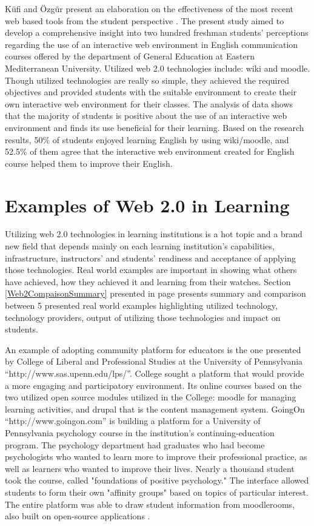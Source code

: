 \documentclass[12pt,a4paper,final,twoside,onecolumn,titlepage]{book}
\begin{document}
Küfi and Özgür present an elaboration on the effectiveness of the most recent web based tools from the student perspective \cite{W11}. The present study aimed to develop a comprehensive insight into two hundred freshman students’ perceptions regarding the use of an interactive web environment in English communication courses offered by the department of General Education at Eastern Mediterranean University. Utilized web 2.0 technologies include: wiki and moodle. Though utilized technologies are really so simple, they achieved the required objectives and provided students with the suitable environment to create their own interactive web environment for their classes. The analysis of data shows that the majority of students is positive about the use of an interactive web environment and finds its use beneficial for their learning. Based on the research results, 50\% of students enjoyed learning English by using wiki/moodle, and 52.5\% of them agree that the interactive web environment created for English course helped them to improve their English.

\section{Examples of Web 2.0 in Learning}
Utilizing web 2.0 technologies in learning institutions is a hot topic and a brand new field that depends mainly on each learning institution’s capabilities, infrastructure, instructors’ and students’ readiness and acceptance of applying those technologies. Real world examples are important in showing what others have achieved, how they achieved it and learning from their watches.  Section \ref{Web2CompaisonSummary} presented in page \pageref{Web2CompaisonSummary} presents summary and comparison between 5 presented real world examples highlighting utilized technology, technology providers, output of utilizing those technologies and impact on students.

An example of adopting community platform for educators is the one presented by 
College of Liberal and Professional Studies at the University of Pennsylvania “http://www.sas.upenn.edu/lps/”. College sought a platform that would provide a more engaging and participatory environment. Its online courses based on the two utilized open source modules utilized in the College: moodle for managing learning activities, and drupal that is the content management system. GoingOn “http://www.goingon.com” is building a platform for a University of Pennsylvania psychology course in the institution's continuing-education program. The psychology department had graduates who had become psychologists who wanted to learn more to improve their professional practice, as well as learners who wanted to improve their lives.  Nearly a thousand student took the course, called "foundations of positive psychology." The interface allowed students to form their own "affinity groups" based on topics of particular interest. The entire platform was able to draw student information from moodlerooms, also built on open-source applications \cite{W12}. 
\end{document}
